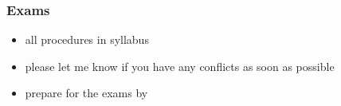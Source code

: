 \documentclass[xcolor=table,11pt,notes=hide,t,handout]{beamer}
\begin{document}
\begin{frame}\frametitle{Exams}

    \begin{itemize}
        \item all procedures in syllabus
        \item please let me know if you have any conflicts as soon as possible
        \item prepare for the exams by 
    \end{itemize}


\end{frame}








\end{document}
